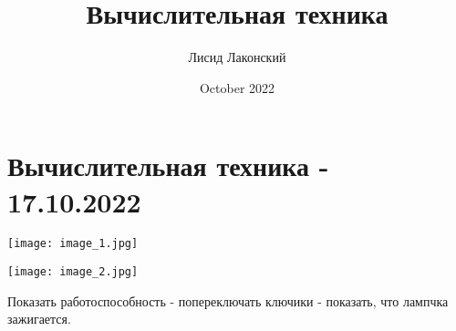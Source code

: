 \documentclass{article}
\title{Вычислительная техника}
\author{Лисид Лаконский}
\date{October 2022}
\begin{document}
\maketitle
\tableofcontents
\pagebreak

\section{Вычислительная техника - 17.10.2022}

\texttt{[image: image\_1.jpg]}

\texttt{[image: image\_2.jpg]}

Показать работоспособность - попереключать ключики - показать, что лампчка зажигается.
\end{document}
